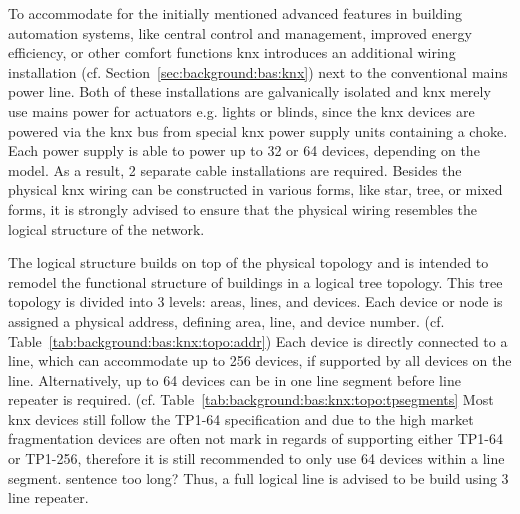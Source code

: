 To accommodate for the initially mentioned advanced features in building automation systems, like central control and management, improved energy efficiency, or other comfort functions \gls{knx} introduces an additional wiring installation (cf. Section~\ref{sec:background:bas:knx}) next to the conventional mains power line. Both of these installations are galvanically isolated and \gls{knx} merely use mains power for actuators e.g. lights or blinds, since the \gls{knx} devices are powered via the \gls{knx} bus from special \gls{knx} power supply units containing a choke.  Each power supply is able to power up to 32 or 64 devices, depending on the model.
As a result, 2 separate cable installations are required.
Besides the physical \gls{knx} wiring can be constructed in various forms, like star, tree, or mixed forms, it is strongly advised to ensure that the physical wiring resembles the logical structure of the network. \parencite{Sokollik2017,Merz2009}

The logical structure builds on top of the physical topology and is intended to remodel the functional structure of buildings in a logical tree topology. This tree topology is divided into 3 levels: areas, lines, and devices. Each device or node is assigned a physical address, defining area, line, and device number. (cf. Table~\ref{tab:background:bas:knx:topo:addr})
Each device is directly connected to a line, which can accommodate up to 256 devices, if supported by all devices on the line. Alternatively, up to 64 devices can be in one line segment before line repeater is required. (cf. Table~\ref{tab:background:bas:knx:topo:tpsegments}
Most \gls{knx} devices still follow the TP1-64 specification and due to the high market fragmentation devices are often not mark in regards of supporting either TP1-64 or TP1-256, therefore it is still recommended to only use 64 devices within a line segment. \alert{sentence too long?} Thus, a full logical line is advised to be build using 3 line repeater. \parencite{Sokollik2017,Merz2009}

